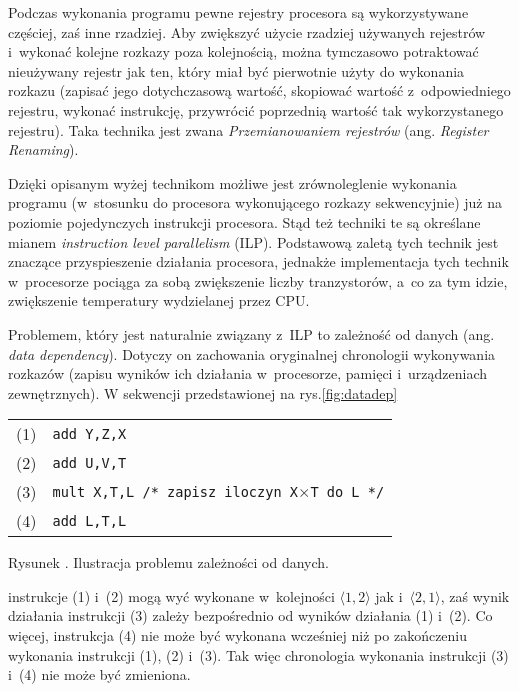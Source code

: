 \documentclass[12pt]{mwart}
\newcounter{figmain}
\newcommand{\myfigcounter}[1]{ \begin{center}Rysunek \arabic{figmain}. #1.\end{center} \addtocounter{figmain}{1} }
\begin{document}
\par
%
\indent
	Podczas wykonania programu pewne rejestry procesora są wykorzystywane częściej, zaś inne rzadziej. Aby zwiększyć użycie rzadziej
	używanych rejestrów i~wykonać kolejne rozkazy poza kolejnością, można tymczasowo potraktować nieużywany rejestr jak ten, który miał
	być pierwotnie użyty do wykonania rozkazu (zapisać jego dotychczasową wartość, skopiować wartość z~odpowiedniego rejestru, wykonać instrukcję,
	przywrócić poprzednią wartość tak wykorzystanego rejestru). Taka technika jest zwana 
	\emph{Przemianowaniem rejestrów} (ang. \emph{Register Renaming}).
\par
%
\indent
	Dzięki opisanym wyżej technikom możliwe jest zrównoleglenie wykonania programu (w~stosunku do procesora wykonującego rozkazy sekwencyjnie)
	już na poziomie pojedynczych instrukcji procesora. Stąd też techniki te są określane mianem \emph{instruction level parallelism} (ILP).
	Podstawową zaletą tych technik jest znaczące przyspieszenie działania procesora, jednakże implementacja tych technik w~procesorze pociąga za
	sobą zwiększenie liczby tranzystorów, a~co za tym idzie, zwiększenie temperatury wydzielanej przez CPU.
\par
%
\indent
	Problemem, który jest naturalnie związany z~ILP to zależność od danych (ang. \emph{data dependency}).
	Dotyczy on zachowania oryginalnej chronologii wykonywania rozkazów (zapisu wyników
	ich działania w~procesorze, pamięci i~urządzeniach zewnętrznych). W sekwencji przedstawionej na rys.\ref{fig:datadep}
	\begin{center}
	\begin{tabular}{l l}\\
		(1) & {\tt add Y,Z,X} \\
		(2) & {\tt add U,V,T} \\
		(3) & {\tt mult X,T,L /* zapisz iloczyn X}$\times${\tt T do L */} \\
		(4) & {\tt add L,T,L} \\
	\end{tabular}
	\myfigcounter{Ilustracja problemu zależności od danych}
	\label{fig:datadep}
	\end{center}
	instrukcje (1) i~(2) mogą wyć wykonane w~kolejności $\langle 1,2 \rangle$ jak i~$\langle 2,1 \rangle$, zaś wynik działania instrukcji
	(3) zależy bezpośrednio od wyników działania (1) i~(2). Co więcej, instrukcja (4) nie może być wykonana wcześniej 
	niż po zakończeniu wykonania instrukcji (1), (2) i~(3). Tak więc chronologia wykonania instrukcji (3) i~(4) nie może być zmieniona.
\par
\end{document}

